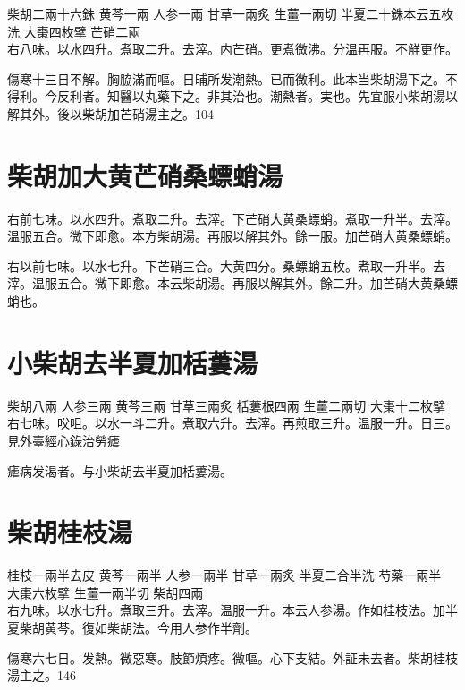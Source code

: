 柴胡{\scriptsize 二兩十六銖} 黄芩{\scriptsize 一兩} 人参{\scriptsize 一兩} 甘草{\scriptsize 一兩炙} 生薑{\scriptsize 一兩切} 半夏{\scriptsize 二十銖本云五枚洗} 大棗{\scriptsize 四枚擘} 芒硝{\scriptsize 二兩}\\
右八味。以水四升。煮取二升。去滓。内芒硝。更煮微沸。分温再服。不觧更作。

傷寒十三日不解。胸脇滿而嘔。日晡所发潮熱{\khaaitp 。已}而微利。此本当柴胡湯下之。不得利。今反利者。知醫以丸藥下之。非其治也。潮熱者。実也。先宜服小柴胡湯以解其外。後以柴胡加芒硝湯主之。104

\section{柴胡加大黄芒硝桑螵蛸湯}

右前七味。以水四升。煮取二升。去滓。下芒硝大黄桑螵蛸。煮取一升半。去滓。温服五合。微下即愈。本方柴胡湯。再服以解其外。餘一服。加芒硝大黄桑螵蛸。{\yuhan}

右以前七味。以水七升。下芒硝三合。大黄四分。桑螵蛸五枚。煮取一升半。去滓。温服五合。微下即愈。本云柴胡湯。再服以解其外。餘二升。加芒硝大黄桑螵蛸也。{\yifang}

\section{小柴胡去半夏加栝蔞湯}

柴胡{\scriptsize 八兩} 人参{\scriptsize 三兩} 黄芩{\scriptsize 三兩} 甘草{\scriptsize 三兩炙} 栝蔞根{\scriptsize 四兩} 生薑{\scriptsize 二兩切} 大棗{\scriptsize 十二枚擘}\\
右七味。㕮咀。以水一斗二升。煮取六升。去滓。再煎取三升。温服一升。日三。{\scriptsize 見外臺經心錄治勞瘧}

瘧病发渴者。与小柴胡去半夏加栝蔞湯。

\section{柴胡桂枝湯}

桂枝{\scriptsize 一兩半去皮} 黄芩{\scriptsize 一兩半} 人参{\scriptsize 一兩半} 甘草{\scriptsize 一兩炙} 半夏{\scriptsize 二合半洗} 芍藥{\scriptsize 一兩半} 大棗{\scriptsize 六枚擘} 生薑{\scriptsize 一兩半切} 柴胡{\scriptsize 四兩}\\
右九味。以水七升。煮取三升。去滓。温服一升。本云人参湯。作如桂枝法。加半夏柴胡黄芩。復如柴胡法。今用人参作半劑。

傷寒六七日。发熱。微惡寒。肢節煩疼。微嘔。心下支結。外証未去者。柴胡桂枝湯主之。146


